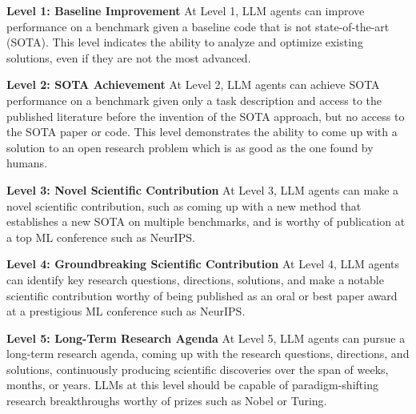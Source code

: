 \documentclass[]{fairmeta}
\newcommand{\dn}[1]{\colorbox{magenta}{\textcolor{white}{Deepak}}\textcolor{magenta}{\textbf{:#1}}}
\newcommand{\rr}[1]{\colorbox{red}{\textcolor{white}{Roberta}}\textcolor{red}{\textbf{:#1}}}
\begin{document}
\textbf{Level 1: Baseline Improvement}
At Level 1, LLM agents can improve performance on a benchmark given a baseline code that is not state-of-the-art (SOTA).
%
This level indicates the ability to analyze and optimize existing solutions, even if they are not the most advanced.
%

\textbf{Level 2: SOTA Achievement}
At Level 2, LLM agents can achieve SOTA performance on a benchmark given only a task description and access to the published literature before the invention of the SOTA approach, but no access to the SOTA paper or code. 
%
This level demonstrates the ability to come up with a solution to an open research problem which is as good as the one found by humans.

\textbf{Level 3: Novel Scientific Contribution}
At Level 3, LLM agents can make a novel scientific contribution, such as coming up with a new method that establishes a new SOTA on multiple benchmarks, and is worthy of publication at a top ML conference such as NeurIPS. 

\textbf{Level 4: Groundbreaking Scientific Contribution}
At Level 4, LLM agents can identify key research questions, directions, solutions, and make a notable scientific contribution worthy of being published as an oral or best paper award at a prestigious ML conference such as NeurIPS.


\textbf{Level 5: Long-Term Research Agenda}
At Level 5, LLM agents can pursue a long-term research agenda, coming up with the research questions, directions, and solutions, continuously producing scientific discoveries over the span of weeks, months, or years. LLMs at this level should be capable of paradigm-shifting research breakthroughs worthy of prizes such as Nobel or Turing.
\end{document}
